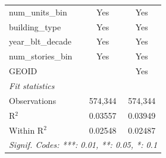 \begin{tabular}{lcc}
   num\_units\_bin                                                     & Yes            & Yes\\  
   building\_type                                                      & Yes            & Yes\\  
   year\_blt\_decade                                                   & Yes            & Yes\\  
   num\_stories\_bin                                                   & Yes            & Yes\\  
   GEOID                                                               &                & Yes\\  
   \midrule
   \emph{Fit statistics}\\
   Observations                                                        & 574,344        & 574,344\\  
   R$^2$                                                               & 0.03557        & 0.03949\\  
   Within R$^2$                                                        & 0.02548        & 0.02487\\  
   \midrule \midrule
   \multicolumn{3}{l}{\emph{Signif. Codes: ***: 0.01, **: 0.05, *: 0.1}}\\
\end{tabular}
\par\endgroup
\begingroup
\centering
